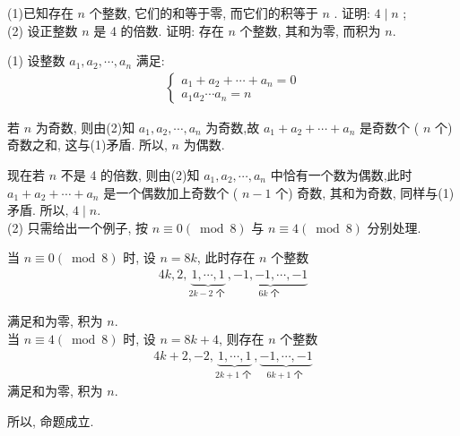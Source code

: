 \begin{example}
	(1)已知存在 $n$ 个整数, 它们的和等于零, 而它们的积等于 $n$ . 证明:  $4 \mid n$ ; \\
	(2) 设正整数 $n$ 是 4 的倍数. 证明: 存在 $n$ 个整数, 其和为零, 而积为 $n$.
\end{example}
\begin{solution}
	(1) 设整数 $a_{1}, a_{2}, \cdots, a_{n}$ 满足:
	\begin{align*}
		\left\{\begin{array}{l}
			       a_{1}+a_{2}+\cdots+a_{n}=0 \\
			       a_{1} a_{2} \cdots a_{n}=n
		       \end{array}\right.
	\end{align*}

	若 $n$ 为奇数, 则由(2)知 $a_{1}, a_{2}, \cdots, a_{n}$ 为奇数,故 $a_{1}+a_{2}+\cdots+a_{n}$ 是奇数个 ( $n$ 个) 奇数之和, 这与(1)矛盾. 所以, $n$ 为偶数.

	现在若 $n$ 不是 4 的倍数, 则由(2)知 $a_{1}, a_{2}, \cdots, a_{n}$ 中恰有一个数为偶数,此时 $a_{1}+a_{2}+\cdots+a_{n}$ 是一个偶数加上奇数个 ( $n-1$ 个) 奇数, 其和为奇数, 同样与(1)矛盾. 所以, $4 \mid n$.\\
	(2) 只需给出一个例子, 按 $n \equiv 0(\bmod 8)$ 与 $n \equiv 4(\bmod 8)$ 分别处理.

	当 $n \equiv 0(\bmod 8)$ 时, 设 $n=8 k$, 此时存在 $n$ 个整数
	\begin{align*}
		4 k, 2, \underbrace{1, \cdots, 1}_{2 k-2 \text { 个 }}, \underbrace{-1,-1, \cdots,-1}_{6 k \text { 个 }}
	\end{align*}

	满足和为零, 积为 $n$.\\
	当 $n \equiv 4(\bmod 8)$ 时, 设 $n=8 k+4$, 则存在 $n$ 个整数
	\begin{align*}
		4 k+2,-2, \underbrace{1, \cdots, 1}_{2 k+1 \text { 个 }}, \underbrace{-1, \cdots,-1}_{6 k+1 \text { 个 }}
	\end{align*}
	满足和为零, 积为 $n$.

	所以, 命题成立.
\end{solution}

